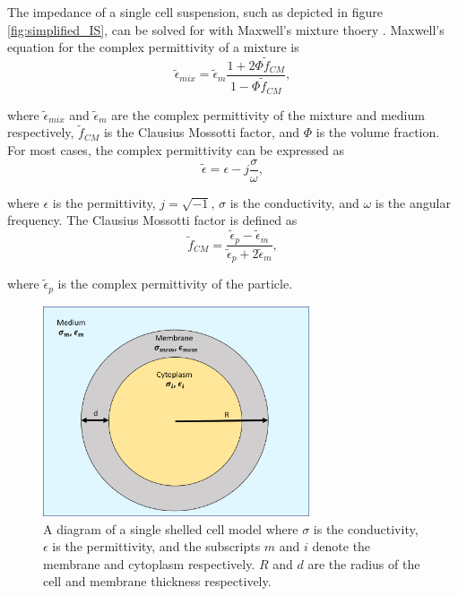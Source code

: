   \par The impedance of a single cell suspension, such as depicted in figure \ref{fig:simplified_IS}, can be solved for with Maxwell's mixture thoery \cite{james_clerk_maxwell_treatise_1892, sun_single-cell_2010}. Maxwell's equation for the complex permittivity of a mixture is
  \begin{equation}
      \tilde{\epsilon}_{mix} = \tilde{\epsilon}_m\frac{1 + 2\Phi\tilde{f}_{CM}}{1-\Phi\tilde{f}_{CM}},
  \end{equation}
  
  \noindent where $\tilde{\epsilon}_{mix}$ and $\tilde{\epsilon}_m$ are the complex permittivity of the mixture and medium respectively, $\tilde{f}_{CM}$ is the Clausius Mossotti factor, and $\Phi$ is the volume fraction. For most cases, the complex permittivity can be expressed as
  \begin{equation}
    \tilde{\epsilon} = \epsilon - j\frac{\sigma}{\omega},
\end{equation}

\noindent where $\epsilon$ is the permittivity, $j = \sqrt{-1}$, $\sigma$ is the conductivity, and $\omega$ is the angular frequency. The Clausius Mossotti factor is defined as
  \begin{equation}
    \tilde{f}_{CM} = \frac{\tilde{\epsilon}_p - \tilde{\epsilon}_m}{\tilde{\epsilon}_p + 2\tilde{\epsilon}_m}, 
  \end{equation}
  
  \noindent where $\tilde{\epsilon}_p$ is the complex permittivity of the particle.

 \begin{figure}[ht]
 \centering
 \includegraphics[width=0.7\textwidth]{images/singleShelledCell.png}
 \caption[Diagram of single shelled cell model.]{A diagram of a single shelled cell model where $\sigma$ is the conductivity, $\epsilon$ is the permittivity, and the subscripts $m$ and $i$ denote the membrane and cytoplasm respectively. $R$ and $d$ are the radius of the cell and membrane thickness respectively.}
 \label{fig:single_shell}
 \end{figure}

